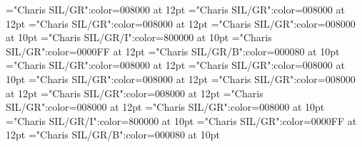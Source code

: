\documentclass[a4paper,twoside]{article}
\begin{document}
\font\variantentrytypesvariantformentrybackrefvariantformentrybackrefsentryletDatadicBody="Charis SIL/GR":color=008000 at 12pt
\font\variantentrytypevariantentrytypesvariantformentrybackrefvariantformentrybackrefsentryletDatadicBody="Charis SIL/GR":color=008000 at 12pt
\font\abbreviationvariantentrytypevariantentrytypesvariantformentrybackrefvariantformentrybackrefsentryletDatadicBody="Charis SIL/GR":color=008000 at 12pt
\font\spanesabbreviationvariantentrytypevariantentrytypesvariantformentrybackrefvariantformentrybackrefsentryletDatadicBody="Charis SIL/GR":color=008000 at 10pt
\font\spanabbreviationvariantentrytypevariantentrytypesvariantformentrybackrefvariantformentrybackrefsentryletDatadicBody="Charis SIL/GR/I":color=800000 at 10pt
\font\headwordvariantformentrybackrefvariantformentrybackrefsentryletDatadicBody="Charis SIL/GR":color=0000FF at 12pt
\font\spanmxbheadwordvariantformentrybackrefvariantformentrybackrefsentryletDatadicBody="Charis SIL/GR/B":color=000080 at 10pt
\font\variantformentrybackrefsbentryletDatadicBody="Charis SIL/GR":color=008000 at 12pt
\font\spanvariantformentrybackrefsbentryletDatadicBody="Charis SIL/GR":color=008000 at 10pt
\font\variantformentrybackrefbvariantformentrybackrefsbentryletDatadicBody="Charis SIL/GR":color=008000 at 12pt
\font\variantentrytypesvariantformentrybackrefbvariantformentrybackrefsbentryletDatadicBody="Charis SIL/GR":color=008000 at 12pt
\font\variantentrytypevariantentrytypesvariantformentrybackrefbvariantformentrybackrefsbentryletDatadicBody="Charis SIL/GR":color=008000 at 12pt
\font\abbreviationvariantentrytypevariantentrytypesvariantformentrybackrefbvariantformentrybackrefsbentryletDatadicBody="Charis SIL/GR":color=008000 at 12pt
\font\spanesabbreviationvariantentrytypevariantentrytypesvariantformentrybackrefbvariantformentrybackrefsbentryletDatadicBody="Charis SIL/GR":color=008000 at 10pt
\font\spanabbreviationvariantentrytypevariantentrytypesvariantformentrybackrefbvariantformentrybackrefsbentryletDatadicBody="Charis SIL/GR/I":color=800000 at 10pt
\font\headwordvariantformentrybackrefbvariantformentrybackrefsbentryletDatadicBody="Charis SIL/GR":color=0000FF at 12pt
\font\spanmxbheadwordvariantformentrybackrefbvariantformentrybackrefsbentryletDatadicBody="Charis SIL/GR/B":color=000080 at 10pt
\end{document}
